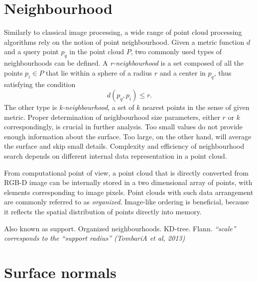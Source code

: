 
\section{Neighbourhood}
\label{sec:neighbourhood}

Similarly to classical image processing, a wide range of point cloud processing algorithms rely on the notion of point neighbourhood. Given a metric function $d$ and a query point $p_q$ in the point cloud $P$, two commonly used types of neighbourhoods can be defined. A \textit{r-neighbourhood} is a set composed of all the points $p_i \in P$ that lie within a sphere of a radius $r$ and a center in $p_q$, thus satisfying the condition
\begin{equation}
d(p_	q, p_i) \leq r.
\end{equation}
The other type is \textit{k-neighbourhood}, a set of $k$ nearest points in the sense of given metric. Proper determination of neighbourhood size parameters, either $r$ or $k$ correspondingly, is crucial in further analysis. Too small values do not provide enough information about the surface. Too large, on the other hand, will average the surface and skip small details. Complexity and efficiency of neighbourhood search depends on different internal data representation in a point cloud.

From computational point of view, a point cloud that is directly converted from RGB-D image can be internally stored in a two dimensional array of points, with elements corresponding to image pixels. Point clouds with such data arrangement are commonly referred to as \textit{organized}. Image-like ordering is beneficial, because it reflects the spatial distribution of points directly into memory.


Also known as support.
Organized neighbourhoods.
KD-tree.
Flann.
\textit{“scale” corresponds to the “support radius” (TombariA et al, 2013)}

\section{Surface normals}
\label{sec:normals}

